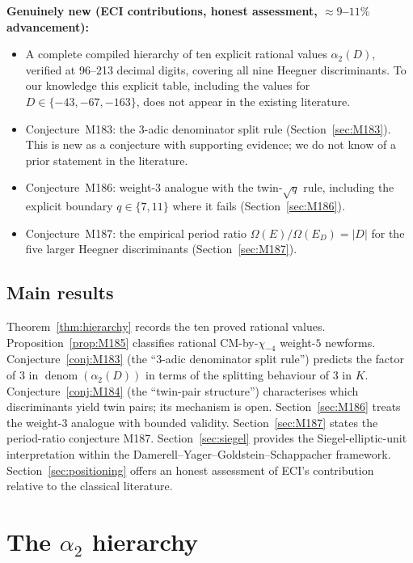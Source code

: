 \documentclass[12pt]{amsart}
\theoremstyle{definition}
\DeclareMathOperator{\denom}{denom}
\newcommand{\Omega}{\varOmega}
\begin{document}
\medskip
\noindent\textbf{Genuinely new (ECI contributions, honest assessment, $\approx 9$--$11\%$ advancement):}
\begin{itemize}
  \item A complete compiled hierarchy of ten explicit rational values
    $\alpha_2(D)$, verified at 96--213 decimal digits, covering all nine
    Heegner discriminants.
    To our knowledge this explicit table, including the values for
    $D \in \{-43, -67, -163\}$, does not appear in the existing literature.
  \item Conjecture~M183: the $3$-adic denominator split rule (Section~\ref{sec:M183}).
    This is new as a conjecture with supporting evidence; we do not know of a
    prior statement in the literature.
  \item Conjecture~M186: weight-$3$ analogue with the twin-$\sqrt{q}$ rule,
    including the explicit boundary $q \in \{7, 11\}$ where it fails
    (Section~\ref{sec:M186}).
  \item Conjecture~M187: the empirical period ratio $\Omega(E)/\Omega(E_D) = |D|$
    for the five larger Heegner discriminants (Section~\ref{sec:M187}).
\end{itemize}

\subsection*{Main results}

Theorem~\ref{thm:hierarchy} records the ten proved rational values.
Proposition~\ref{prop:M185} classifies rational CM-by-$\chi_{-4}$ weight-$5$
newforms.
Conjecture~\ref{conj:M183} (the ``$3$-adic denominator split rule'') predicts
the factor of $3$ in $\denom(\alpha_2(D))$ in terms of the splitting behaviour
of $3$ in $K$.
Conjecture~\ref{conj:M184} (the ``twin-pair structure'') characterises which
discriminants yield twin pairs; its mechanism is open.
Section~\ref{sec:M186} treats the weight-$3$ analogue with bounded validity.
Section~\ref{sec:M187} states the period-ratio conjecture M187.
Section~\ref{sec:siegel} provides the Siegel-elliptic-unit interpretation
within the Damerell--Yager--Goldstein--Schappacher framework.
Section~\ref{sec:positioning} offers an honest assessment of ECI's contribution
relative to the classical literature.

\section{The $\alpha_2$ hierarchy}
\label{sec:hierarchy}
\end{document}
